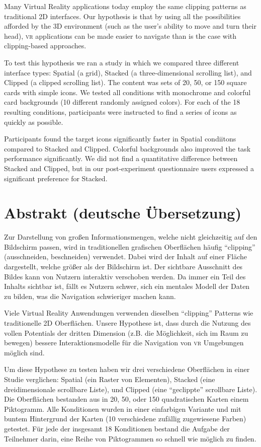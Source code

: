 \documentclass[nobib]{tufte-book} %
\begin{document}
Many Virtual Reality applications today employ the same clipping patterns as traditional 2D interfaces. Our hypothesis is that by using all the possibilities afforded by the 3D environment (such as the user's ability to move and turn their head), \textsc{vr} applications can be made easier to navigate than is the case with clipping-based approaches.

To test this hypothesis we ran a study in which we compared three different interface types: Spatial (a grid), Stacked (a three-dimensional scrolling list), and Clipped (a clipped scrolling list). The content was sets of 20, 50, or 150 square cards with simple icons. We tested all conditions with monochrome and colorful card backgrounds (10 different randomly assigned colors). For each of the 18 resulting conditions, participants were instructed to find a series of icons as quickly as possible.

Participants found the target icons significantly faster in Spatial condiitons compared to Stacked and Clipped. Colorful backgrounds also improved the task performance significantly. We did not find a quantitative difference between Stacked and Clipped, but in our post-experiment questionnaire users expressed a significant preference for Stacked.

\chapter{Abstrakt (deutsche {\"U}bersetzung)}
Zur Darstellung von gro{\ss}en Informationsmengen, welche nicht gleichzeitig auf den Bildschirm passen, wird in traditionellen grafischen Oberfl{\"a}chen h{\"a}ufig ``clipping'' (ausschneiden, beschneiden) verwendet. Dabei wird der Inhalt auf einer Fl{\"a}che dargestellt, welche gr{\"o}{\ss}er als der Bildschirm ist. Der sichtbare Ausschnitt des Bildes kann von Nutzern interaktiv verschoben werden. Da immer ein Teil des Inhalts sichtbar ist, f{\"a}llt es Nutzern schwer, sich ein mentales Modell der Daten zu bilden, was die Navigation schwieriger machen kann.

Viele Virtual Reality Anwendungen verwenden dieselben ``clipping'' Patterns wie traditionelle 2D Oberfl{\"a}chen. Unsere Hypothese ist, dass durch die Nutzung des vollen Potentials der dritten Dimension (z.B. die M{\"o}glichkeit, sich im Raum zu bewegen) bessere Interaktionsmodelle f{\"u}r die Navigation von \textsc{vr} Umgebungen m{\"o}glich sind.

Um diese Hypothese zu testen haben wir drei verschiedene Oberfl{\"a}chen in einer Studie verglichen: Spatial (ein Raster von Elementen), Stacked (eine dreidimensionale scrollbare Liste), und Clipped (eine ``geclippte'' scrollbare Liste). Die Oberfl{\"a}chen bestanden aus in 20, 50, oder 150 quadratischen Karten einem Piktogramm. Alle Konditionen wurden in einer einfarbigen Variante und mit buntem Hintergrund der Karten (10 verschiedene zuf{\"a}llig zugewiesene Farben) getestet. F{\"u}r jede der insgesamt 18 Konditionen bestand die Aufgabe der Teilnehmer darin, eine Reihe von Piktogrammen so schnell wie m{\"o}glich zu finden.
\end{document}
